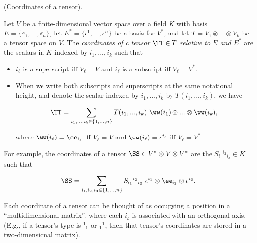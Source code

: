 \begin{defn}
\label{ch::motivated_intro::defn::pq_tensor_coords}
    (Coordinates of a tensor).

    Let $V$ be a finite-dimensional vector space over a field $K$ with basis $E = \{\ee_1, ..., \ee_n\}$, let $E^* = \{\epsilon^1, ..., \epsilon^n\}$ be a basis for $V^*$, and let $T = V_1 \otimes ... \otimes V_k$ be a tensor space on $V$. The \textit{coordinates of a tensor $\TT \in T$ relative to $E$ and $E^*$} are the scalars in $K$ indexed by $i_1, ..., i_k$ such that
    
    \begin{itemize}
        \item $i_\ell$ is a superscript iff $V_\ell = V$ and $i_\ell$ is a subscript iff $V_\ell = V^*$.
        \item When we write both subscripts and superscripts at the same notational height, and denote the scalar indexed by $i_1, ..., i_k$ by $T(i_1, ..., i_k)$, we have 
        
        \begin{align*}
            \TT = \sum_{i_1, ..., i_k \in \{1, ..., n\}} T(i_1, ..., i_k) \spc \ww(i_1) \otimes ... \otimes \ww(i_k),
        \end{align*}
        
        where $\ww(i_\ell) = \ee_{i_\ell}$ iff $V_\ell = V$ and $\ww(i_\ell) = \epsilon^{i_\ell}$ iff $V_\ell = V^*$.
    \end{itemize}
    
    For example, the coordinates of a tensor $\SS \in V^* \otimes V \otimes V^*$ are the $S_{i_1}{}^{i_2}{}_{i_3} \in K$ such that
    
    \begin{align*}
        \SS = \sum_{i_1, i_2, i_3 \in \{1, ..., n\}} S_{i_1}{}^{i_2}{}_{i_3} \spc \epsilon^{i_1} \otimes \ee_{i_2} \otimes \epsilon^{i_3}.
    \end{align*}
    
    
    Each coordinate of a tensor can be thought of as occupying a position in a           ``multidimensional matrix'', where each $i_k$ is associated with an orthogonal axis. (E.g., if a tensor's type is $^1{}_1$ or $_1{}^1$, then that tensor's coordinates are stored in a two-dimensional matrix).
\end{defn}

